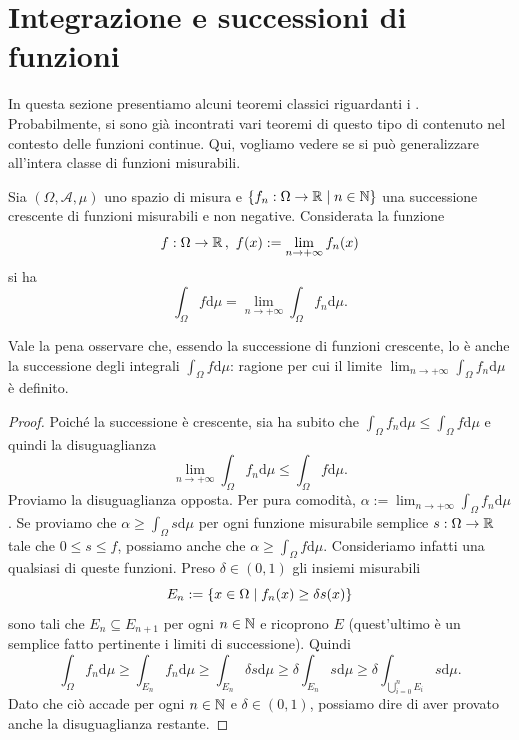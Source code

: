 
\section{Integrazione e successioni di funzioni}

In questa sezione presentiamo alcuni teoremi classici riguardanti i . Probabilmente, si sono già incontrati vari teoremi di questo tipo di contenuto nel contesto delle funzioni continue. Qui, vogliamo vedere se si può generalizzare all'intera classe di funzioni misurabili.

\begin{proposizione}\label{proposizione:BeppoLevi}
Sia \((\Omega, \mathcal A, \mu)\) uno spazio di misura e \(\left\{f_n : \Omega \to \mathbb R \mid n \in \mathbb N\right\}\) una successione crescente di funzioni misurabili e non negative. Considerata la funzione
\[ f : \Omega \to \mathbb R \,, \ f(x) := \lim_{n \to +\infty} f_n(x) \]
si ha
\[\int_\Omega f \mathrm d \mu = \lim_{n \to +\infty} \int_\Omega f_n \mathrm d \mu .\]
\end{proposizione}

Vale la pena osservare che, essendo la successione di funzioni crescente, lo è anche la successione degli integrali \(\int_\Omega f \mathrm d \mu\): ragione per cui il limite \(\displaystyle\lim_{n \to +\infty} \int_\Omega f_n \mathrm d \mu\) è definito.

\begin{proof}
Poiché la successione è crescente, sia ha subito che \(\int_\Omega f_n \mathrm d \mu \le \int_\Omega f \mathrm d \mu\) e quindi la disuguaglianza
\[\lim_{n \to +\infty} \int_\Omega f_n \mathrm d \mu \le \int_\Omega f \mathrm d \mu .\]
Proviamo la disuguaglianza opposta. Per pura comodità, \(\alpha := \lim_{n \to +\infty} \int_\Omega f_n \mathrm d \mu\). Se proviamo che \(\alpha \ge \int_\Omega s \mathrm d \mu\) per ogni funzione misurabile semplice \(s : \Omega \to \mathbb R\) tale che \(0 \le s \le f\), possiamo anche che \(\alpha \ge \int_\Omega f \mathrm d \mu\). Consideriamo infatti una qualsiasi di queste funzioni. Preso \(\delta \in (0, 1)\) gli insiemi misurabili
\[E_n := \left\{x \in \Omega \mid f_n(x) \ge \delta s(x)\right\}\]
sono tali che \(E_n \subseteq E_{n+1}\) per ogni \(n \in \mathbb N\) e ricoprono \(E\) (quest'ultimo è un semplice fatto pertinente i limiti di successione). Quindi
\[\int_\Omega f_n \mathrm d \mu \ge \int_{E_n} f_n \mathrm d \mu \ge \int_{E_n} \delta s \mathrm d \mu \ge \delta \int_{E_n} s \mathrm d \mu \ge \delta \int_{\bigcup_{i=0}^n E_i} s \mathrm d \mu .\]
Dato che ciò accade per ogni \(n \in \mathbb N\) e \(\delta \in (0, 1)\), possiamo dire di aver provato anche la disuguaglianza restante.
\end{proof}


